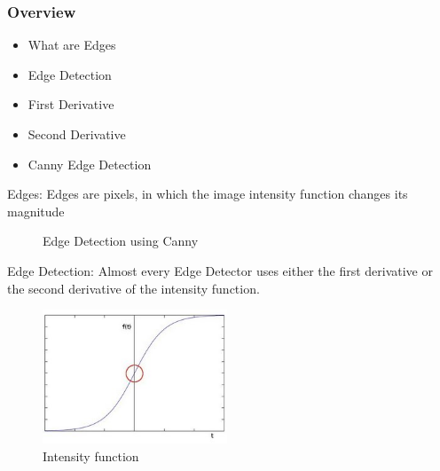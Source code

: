 \documentclass{beamer}
\begin{document}
\begin{frame}
	\frametitle{Overview}
	\begin{itemize}
		\item What are Edges
		\item Edge Detection
		\item First Derivative
		\item Second Derivative
		\item Canny Edge Detection
	\end{itemize}
\end{frame}
\begin{frame}
		\begin{block}{Edges:}
			Edges are pixels, in which the image intensity function changes its
			magnitude
		\end{block}
	\begin{figure} 
		\caption{Edge Detection using Canny} 
		\end{figure}
\end{frame}

\begin{frame}
	\begin{block}{Edge Detection:}
		Almost every Edge Detector uses either the first derivative or the second derivative of the intensity function. 
	\end{block}
	\begin{figure} 
		\includegraphics[width=0.49\textwidth]{edge3.jpg}
		\caption{Intensity function} 
	\end{figure}
\end{frame}
\end{document}
